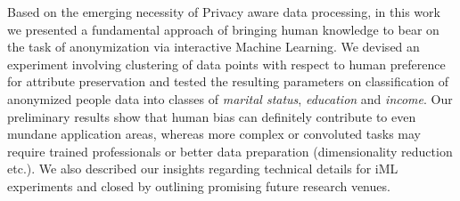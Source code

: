 \documentclass{llncs}
\begin{document}
Based on the emerging necessity of Privacy aware data processing, in this work we presented a fundamental approach of bringing human knowledge to bear on the task of anonymization via interactive Machine Learning. We devised an experiment involving clustering of data points with respect to human preference for attribute preservation and tested the resulting parameters on classification of anonymized people data into classes of \textit{marital status}, \textit{education} and \textit{income}. Our preliminary results show that human bias can definitely contribute to even mundane application areas, whereas more complex or convoluted tasks may require trained professionals or better data preparation (dimensionality reduction etc.). We also described our insights regarding technical details for iML experiments and closed by outlining promising future research venues.




\end{document}
